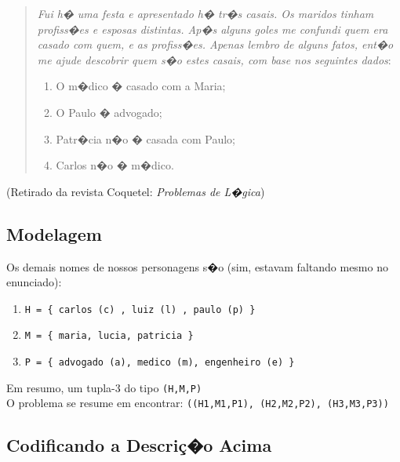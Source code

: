 \documentclass[final,a4paper]{article}
\begin{document}
\begin{quotation}

{\em Fui h� uma festa e  apresentado h� tr�s casais.
Os maridos tinham profiss�es  e esposas distintas. 
Ap�s alguns {\em goles} me confundi quem era casado com quem,
e as profiss�es.
Apenas lembro de alguns fatos, ent�o me ajude descobrir quem
s�o estes casais, com base nos seguintes dados}:
\begin{enumerate}
\item  O m�dico � casado com a Maria;
\item  O Paulo � advogado;
\item  Patr�cia n�o � casada com Paulo;
\item  Carlos n�o � m�dico.
\end{enumerate}
\end{quotation}

(Retirado da revista Coquetel: {\em Problemas de L�gica})

\subsection{Modelagem}
Os demais nomes de nossos personagens s�o (sim, estavam faltando mesmo no
enunciado):
\begin{enumerate}

\item \texttt{H = \{ carlos (c) , luiz (l) , paulo (p) \}}
\item \texttt{M = \{ maria, lucia, patricia \}}
\item \texttt{P = \{ advogado (a), medico (m), engenheiro (e) \}}
\end{enumerate}
Em resumo, um tupla-3 do tipo \texttt{(H,M,P)} \\

O problema se resume em encontrar: \texttt{((H1,M1,P1), (H2,M2,P2), (H3,M3,P3))}

\subsection{Codificando a Descri\c{c}�o Acima}
\end{document}
